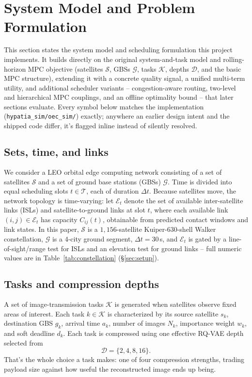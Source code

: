 \section{System Model and Problem Formulation}
\label{sec:formulation}

This section states the system model and scheduling formulation this project implements. It builds directly on the original system-and-task model and rolling-horizon MPC objective (satellites $\mathcal{S}$, GBSs $\mathcal{G}$, tasks $\mathcal{K}$, depths $\mathcal{D}$, and the basic MPC structure), extending it with a concrete quality signal, a unified multi-term utility, and additional scheduler variants -- congestion-aware routing, two-level and hierarchical MPC couplings, and an offline optimality bound -- that later sections evaluate. Every symbol below matches the implementation (\texttt{hypatia\_sim/oec\_sim/}) exactly; anywhere an earlier design intent and the shipped code differ, it's flagged inline instead of silently resolved.

\subsection{Sets, time, and links}

We consider a LEO orbital edge computing network consisting of a set of satellites $\mathcal{S}$ and a set of ground base stations (GBSs) $\mathcal{G}$. Time is divided into equal scheduling slots $t \in \mathcal{T}$, each of duration $\Delta t$. Because satellites move, the network topology is time-varying: let $\mathcal{E}_t$ denote the set of available inter-satellite links (ISLs) and satellite-to-ground links at slot $t$, where each available link $(i,j) \in \mathcal{E}_t$ has capacity $C_{ij}(t)$, obtainable from predicted contact windows and link states. In this paper, $\mathcal{S}$ is a $1{,}156$-satellite Kuiper-630-shell Walker constellation, $\mathcal{G}$ is a 4-city ground segment, $\Delta t = 30$\,s, and $\mathcal{E}_t$ is gated by a line-of-sight/range test for ISLs and an elevation test for ground links -- full numeric values are in Table~\ref{tab:constellation} (\S\ref{sec:setup}).

\subsection{Tasks and compression depths}

A set of image-transmission tasks $\mathcal{K}$ is generated when satellites observe fixed areas of interest. Each task $k \in \mathcal{K}$ is characterized by its source satellite $s_k$, destination GBS $g_k$, arrival time $a_k$, number of images $N_k$, importance weight $w_k$, and soft deadline $d_k$. Each task is compressed using one effective RQ-VAE depth selected from
\begin{equation}
\mathcal{D} = \{2, 4, 8, 16\}.
\end{equation}
That's the whole choice a task makes: one of four compression strengths, trading payload size against how useful the reconstructed image ends up being.

